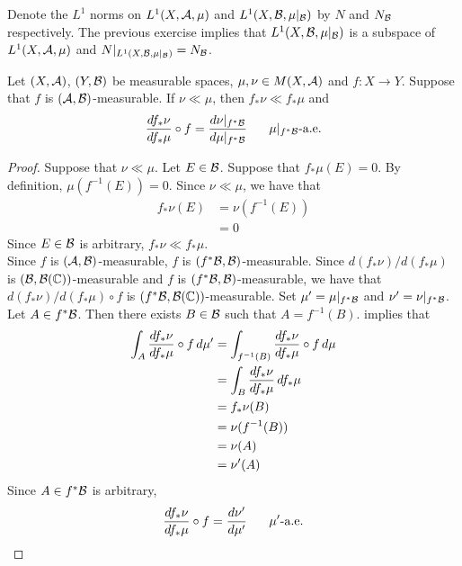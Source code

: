 \documentclass{book}
\begin{document}
	\begin{note}
		Denote the $L^1$ norms on $L^1(X, \mathcal{A}, \mu)$ and $L^1(X, \mathcal{B}, \mu|_{\mathcal{B}})$ by $N$ and $N_{\mathcal{B}}$ respectively. The previous exercise implies that $L^1(X, \mathcal{B}, \mu|_{\mathcal{B}})$ is a subspace of $L^1(X, \mathcal{A}, \mu)$ and $N|_{L^1(X, \mathcal{B},\mu|_{\mathcal{B}})} = N_{\mathcal{B}}$.
	\end{note}
	
	
	\begin{ex} 
		Let $(X, \mathcal{A})$, $(Y, \mathcal{B})$ be measurable spaces, $\mu, \nu \in M(X,\mathcal{A})$ and $f: X \rightarrow Y$. Suppose that $f$ is $(\mathcal{A}, \mathcal{B})$-measurable. If $\nu \ll \mu$, then $f_*\nu \ll f_*\mu$ and 
		$$\frac{d f_*\nu}{d f_*\mu} \circ f = \frac{d\nu|_{f^* \mathcal{B}}}{d \mu|_{f^*\mathcal{B}}}  \hspace{.5cm} \text{ $\mu|_{f^*\mathcal{B}}$-a.e.}$$ 
	\end{ex}
	
	\begin{proof}
		Suppose that $\nu \ll \mu$. Let $E \in \mathcal{B}$. Suppose that $f_*\mu(E) = 0$. By definition, $\mu(f^{-1}(E)) = 0$. Since $\nu \ll \mu$, we have that 
		\begin{align*}
			f_*\nu(E)
			& = \nu(f^{-1}(E)) \\
			& = 0
		\end{align*}
		Since $E \in \mathcal{B}$ is arbitrary, $f_*\nu \ll f_*\mu$. \\
		Since $f$ is $(\mathcal{A}, \mathcal{B})$-measurable, $f$ is $(f^*\mathcal{B}, \mathcal{B})$-measurable. Since $d(f_*\nu)/d(f_*\mu)$ is $(\mathcal{B}, \mathcal{B}(\mathbb{C}))$-measurable and $f$ is $(f^*\mathcal{B}, \mathcal{B})$-measurable, we have that $d(f_*\nu)/d(f_*\mu) \circ f$ is $(f^*\mathcal{B}, \mathcal{B}(\mathbb{C}))$-measurable. Set $\mu' = \mu|_{f^*\mathcal{B}}$ and $\nu' = \nu|_{f^*\mathcal{B}}$. Let $A \in f^*\mathcal{B}$. Then there exists $B \in \mathcal{B}$ such that $A = f^{-1}(B)$.  implies that  
		\begin{align*}
			\int_A \frac{d f_* \nu}{d f_* \mu} \circ f \, d \mu' 
			& = \int_{f^{-1}(B)} \frac{d f_* \nu}{d f_* \mu} \circ f \, d \mu \\
			& = \int_B \frac{d f_* \nu}{d f_* \mu} \, d f_* \mu \\
			& = f_* \nu(B) \\
			& = \nu(f^{-1}(B)) \\
			& = \nu(A) \\
			& = \nu'(A)
		\end{align*}
		Since $A \in f^*\mathcal{B}$ is arbitrary, 
		$$\frac{d f_* \nu}{d f_* \mu} \circ f = \frac{d\nu'}{d\mu'} \hspace{.5cm} \text{ $\mu'$-a.e.}$$
	\end{proof}
	
\end{document}
